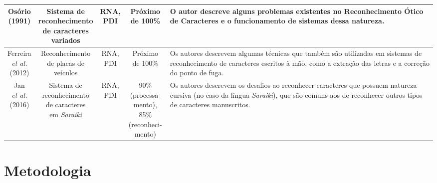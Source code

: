 \documentclass[12pt,oneside,a4paper,chapter=TITLE,section=TITLE,sumario
		=tradicional]{abntex2}
\begin{document}
\begin{quadro}[H]
\begin{tabular}{| c | c | c | c | p{6cm} |}
				\makecell{Osório\\(1991)} & \makecell{Sistema de\\ reconhecimento \\de caracteres \\variados} & \makecell{RNA,\\PDI} & \makecell{Próximo\\de 100\%} &\vspace{-1.2cm}O autor descreve alguns problemas existentes no Reconhecimento Ótico de Caracteres e o funcionamento de sistemas dessa natureza.\\ \hline 
				
				\makecell{Ferreira\\\textit{et al.}\\(2012)} & \makecell{Reconhecimento\\de placas de\\veículos} & \makecell{RNA,\\PDI} & \makecell{Próximo\\de 100\%} &\vspace{-0.9cm}Os autores descrevem algumas técnicas que também são utilizadas em sistemas de reconhecimento de caracteres escritos à mão, como a extração das letras e a correção do ponto de fuga.\\ \hline 
				
				\makecell{Jan\\\textit{et al.}\\(2016)} & \makecell{Sistema de\\reconhecimento\\de caracteres\\em \textit{Saraiki}} & \makecell{RNA,\\PDI} & \makecell{90\%\\ (processa-\\mento), 85\%\\(reconheci-\\mento)} &\vspace{-1.4cm}Os autores descrevem os desafios ao reconhecer caracteres que possuem natureza cursiva (no caso da língua \textit{Saraiki}), que são comuns aos de reconhecer outros tipos de caracteres manuscritos.\\\hline	
			\end{tabular}
			\vspace{0.1cm}
		\end{quadro}
				
		\chapter{Metodologia}
		\label{cap:metodologia}
		
\end{document}
